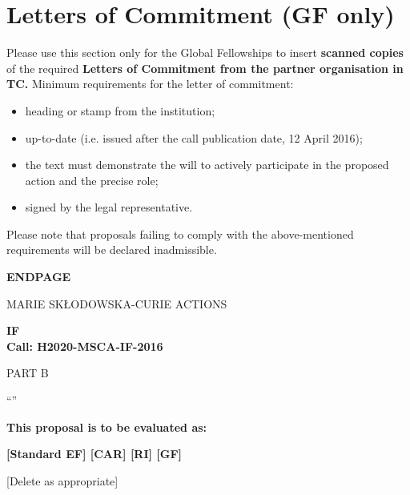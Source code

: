 \newpage
\section{Letters of Commitment (GF only)}
\label{sec:letters}

Please use this section only for the Global Fellowships to insert {\bf scanned copies} of the required {\bf Letters of Commitment from the partner organisation in TC.} 
Minimum requirements for the letter of commitment: 

\begin{itemize}
  \item heading or stamp from the institution; 
  \item up-to-date (i.e. issued after the call publication date, 12 April 2016); 
  \item the text must demonstrate the will to actively participate in the proposed action and the precise role;
  \item signed by the legal representative.
\end{itemize}


\medskip\noindent
Please note that proposals failing to comply with the above-mentioned requirements will be declared inadmissible.





\newpage
\label{sec:endpage}
\vspace{15mm}
\begin{center}


        \Large{
      
     
        \textbf{ENDPAGE}
  
          \vspace{15mm}
          MARIE SK\L{}ODOWSKA-CURIE ACTIONS\\
          \vspace{1cm}
          
          \textbf{\acf{IF}}\\
          \textbf{Call: H2020-MSCA-IF-2016}
          \vspace{2cm}                   

          PART B
          \vspace{2.5cm}

          ``\IFacronym''
          \vspace{2cm}

          \textbf{This proposal is to be evaluated as:}
          \vspace{.5cm}

          \textbf{[Standard EF] [CAR] [RI] [GF]}\\
        }
        \large{[Delete as appropriate]}

  \end{center}
\vspace{1cm}
